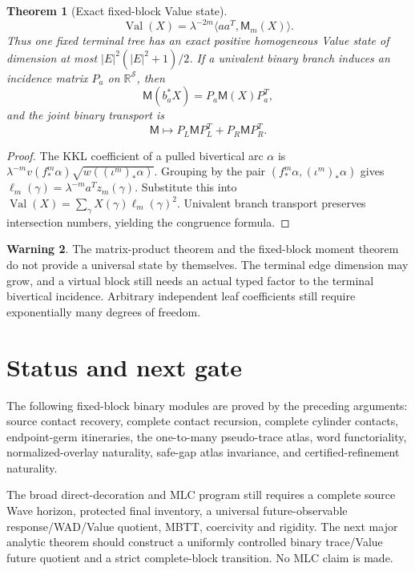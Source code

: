 \documentclass[11pt]{article}
\newtheorem{theorem}{Theorem}[section]
\theoremstyle{definition}
\newtheorem{warning}[theorem]{Warning}
\theoremstyle{remark}
\begin{document}
\begin{theorem}[Exact fixed-block Value state]
\[
 \boxed{
 \operatorname{Val}(X)=\lambda^{-2m}
 \langle aa^T,\mathsf M_m(X)\rangle.}
\]
Thus one fixed terminal tree has an exact positive homogeneous Value state of
dimension at most $|E|^2(|E|^2+1)/2$.  If a univalent binary branch induces
an incidence matrix $P_a$ on $\mathbb R^{\mathcal S}$, then
\[
 \mathsf M(b_a^*X)=P_a\mathsf M(X)P_a^T,
\]
and the joint binary transport is
\[
 \mathsf M\longmapsto
 P_L\mathsf MP_L^T+P_R\mathsf MP_R^T.
\]
\end{theorem}

\begin{proof}
The KKL coefficient of a pulled bivertical arc $\alpha$ is
$\lambda^{-m}v(f_*^m\alpha)\sqrt{w((\iota^m)_*\alpha)}$.
Grouping by the pair $(f_*^m\alpha,(\iota^m)_*\alpha)$ gives
$\ell_m(\gamma)=\lambda^{-m}a^Tz_m(\gamma)$.  Substitute this into
$\operatorname{Val}(X)=\sum_\gamma X(\gamma)\ell_m(\gamma)^2$.
Univalent branch transport preserves intersection numbers, yielding the
congruence formula.
\end{proof}

\begin{warning}
The matrix-product theorem and the fixed-block moment theorem do not provide a
universal state by themselves.  The terminal edge dimension may grow, and a
virtual block still needs an actual typed factor to the terminal bivertical
incidence.  Arbitrary independent leaf coefficients still require exponentially
many degrees of freedom.
\end{warning}

\section{Status and next gate}
The following fixed-block binary modules are proved by the preceding arguments:
source contact recovery, complete contact recursion, complete cylinder
contacts, endpoint-germ itineraries, the one-to-many pseudo-trace atlas, word
functoriality, normalized-overlay naturality, safe-gap atlas invariance, and
certified-refinement naturality.

The broad direct-decoration and MLC program still requires a complete source
Wave horizon, protected final inventory, a universal future-observable
response/WAD/Value quotient, MBTT, coercivity and rigidity.  The next major
analytic theorem should construct a uniformly controlled binary trace/Value
future quotient and a strict complete-block transition.  No MLC claim is made.
\end{document}
